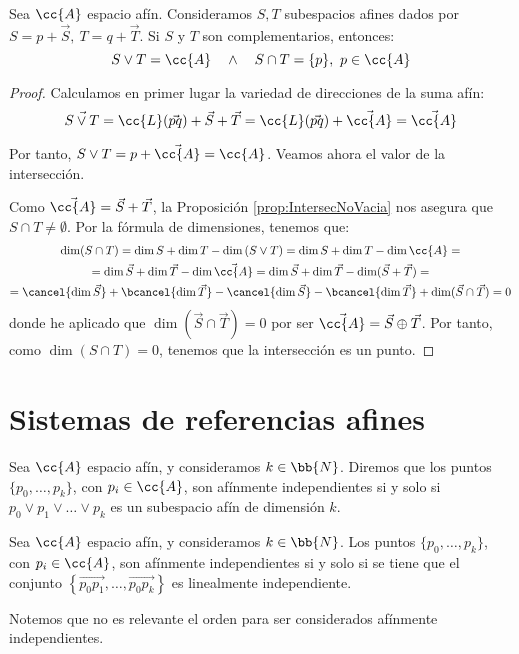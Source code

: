 \begin{prop}\label{prop:ComplementariosSumaIntersec}
    Sea $\cc{A}$ espacio afín. Consideramos $S,T$ subespacios afines dados por $S=p+\vec{S},~T=q+\vec{T}$. Si $S$ y $T$ son complementarios, entonces:
    $$S\vee T=\cc{A} \quad \land \quad S\cap T=\{p\}, ~p\in \cc{A}$$
\end{prop}
\begin{proof}
    Calculamos en primer lugar la variedad de direcciones de la suma afín:
    \begin{equation*}
        \vec{S\vee T} = \cc{L}(\vec{pq}) + \vec{S} + \vec{T} = \cc{L}(\vec{pq}) + \vec{\cc{A}} = \vec{\cc{A}}
    \end{equation*}

    Por tanto, $S\vee T=p+\vec{\cc{A}}=\cc{A}$. Veamos ahora el valor de la intersección.
    
    Como $\vec{\cc{A}}=\vec{S} + \vec{T}$, la Proposición \ref{prop:IntersecNoVacia} nos asegura que $S\cap T\neq \emptyset$. Por la fórmula de dimensiones, tenemos que:
    \begin{multline*}
        \dim (S\cap T)= \dim S + \dim T - \dim \left(S\vee T\right) = \dim S + \dim T - \dim \cc{A}
        =\\= \dim \vec{S} + \dim \vec{T} - \dim \vec{\cc{A}}
        = \dim \vec{S} + \dim \vec{T} - \dim (\vec{S} + \vec{T}) =\\
        = \cancel{\dim \vec{S}} + \bcancel{\dim \vec{T}} -\cancel{\dim \vec{S}} - \bcancel{\dim \vec{T}} +\dim (\vec{S} \cap \vec{T})= 0
    \end{multline*}
    donde he aplicado que $\dim (\vec{S} \cap \vec{T})= 0$ por ser $\vec{\cc{A}}=\vec{S}\oplus \vec{T}$.
    Por tanto, como $\dim(S\cap T)=0$, tenemos que la intersección es un punto.
\end{proof}




\section{Sistemas de referencias afines}
\begin{definicion}
    Sea $\cc{A}$ espacio afín, y consideramos $k\in \bb{N}$.
    Diremos que los puntos $\{p_0,\dots, p_k\}$, con $p_i\in \cc{A}$, son afínmente independientes si y solo si $p_0\vee p_1\vee\dots \vee p_k$ es un subespacio afín de dimensión $k$.
\end{definicion}

\begin{prop}\label{prop:CarPuntosIndep}
    Sea $\cc{A}$ espacio afín, y consideramos $k\in \bb{N}$. Los puntos $\{p_0,\dots, p_k\}$, con $p_i\in \cc{A}$, son afínmente independientes si y solo si se tiene que el conjunto $\left\{\vec{p_0p_1}, \dots, \vec{p_0p_k}\right\}$ es linealmente independiente.
\end{prop}
Notemos que no es relevante el orden para ser considerados afínmente independientes.


